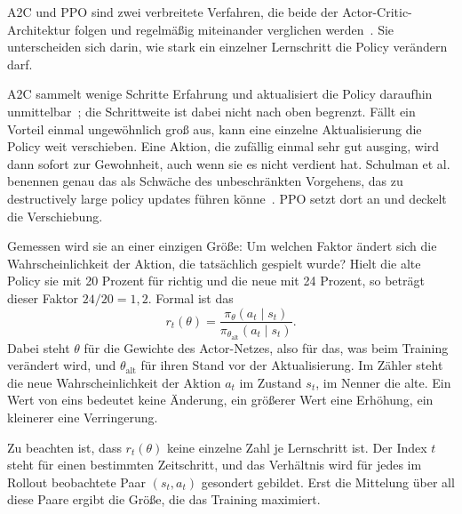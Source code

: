 \ac{A2C} und \ac{PPO} sind zwei verbreitete Verfahren, die beide der
Actor-Critic-Architektur folgen und regelmäßig miteinander verglichen
werden~\cite{delafuente2024comparative}. Sie unterscheiden sich darin, wie stark
ein einzelner Lernschritt die Policy verändern darf.

A2C sammelt wenige Schritte Erfahrung und aktualisiert die Policy daraufhin
unmittelbar~\cite[Abschn.~13.5]{suttonbarto2018}; die Schrittweite ist dabei
nicht nach oben begrenzt. Fällt ein Vorteil einmal ungewöhnlich groß aus, kann
eine einzelne Aktualisierung die Policy weit verschieben. Eine Aktion, die
zufällig einmal sehr gut ausging, wird dann sofort zur Gewohnheit, auch wenn sie
es nicht verdient hat. Schulman et al. benennen genau das als Schwäche des
unbeschränkten Vorgehens, das zu \glqq destructively large policy
updates\grqq{} führen könne~\cite[Abschn.~2.1]{schulman2017ppo}. \ac{PPO} setzt
dort an und deckelt die Verschiebung.

Gemessen wird sie an einer einzigen Größe: Um welchen Faktor ändert sich die
Wahrscheinlichkeit der Aktion, die tatsächlich gespielt wurde? Hielt die alte
Policy sie mit 20 Prozent für richtig und die neue mit 24 Prozent, so beträgt
dieser Faktor $24/20 = 1{,}2$. Formal ist das~\cite[Abschn.~3]{schulman2017ppo}
%
\begin{equation}
  \label{eq:ppo-ratio}
  r_t(\theta) = \frac{\pi_{\theta}(a_t \mid s_t)}{\pi_{\theta_{\text{alt}}}(a_t \mid s_t)}.
\end{equation}
%
Dabei steht $\theta$ für die Gewichte des Actor-Netzes, also für das, was beim
Training verändert wird, und $\theta_{\text{alt}}$ für ihren Stand vor der
Aktualisierung. Im Zähler steht die neue Wahrscheinlichkeit der Aktion $a_t$ im
Zustand $s_t$, im Nenner die alte. Ein Wert von eins bedeutet keine Änderung,
ein größerer Wert eine Erhöhung, ein kleinerer eine Verringerung.

Zu beachten ist, dass $r_t(\theta)$ keine einzelne Zahl je Lernschritt ist. Der
Index $t$ steht für einen bestimmten Zeitschritt, und das Verhältnis wird für
jedes im Rollout beobachtete Paar $(s_t, a_t)$ gesondert gebildet. Erst die
Mittelung über all diese Paare ergibt die Größe, die das Training maximiert.

